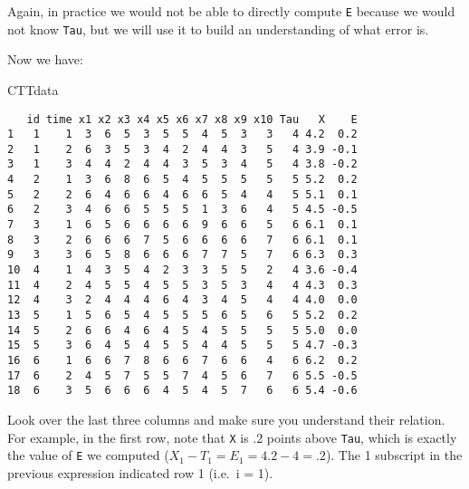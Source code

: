 \documentclass[
]{book}
\newenvironment{Shaded}{\begin{snugshade}}{\end{snugshade}}
\newcommand{\AttributeTok}[1]{\textcolor[rgb]{0.77,0.63,0.00}{#1}}
\newcommand{\DecValTok}[1]{\textcolor[rgb]{0.00,0.00,0.81}{#1}}
\newcommand{\FunctionTok}[1]{\textcolor[rgb]{0.00,0.00,0.00}{#1}}
\newcommand{\NormalTok}[1]{#1}
\newcommand{\OtherTok}[1]{\textcolor[rgb]{0.56,0.35,0.01}{#1}}
\newcommand{\SpecialCharTok}[1]{\textcolor[rgb]{0.00,0.00,0.00}{#1}}
\begin{document}
Again, in practice we would not be able to directly compute \texttt{E} because we would not know \texttt{Tau}, but we will use it to build an understanding of what error is.

Now we have:

\begin{Shaded}
\begin{Highlighting}[]
\NormalTok{CTTdata}
\end{Highlighting}
\end{Shaded}

\begin{verbatim}
   id time x1 x2 x3 x4 x5 x6 x7 x8 x9 x10 Tau   X    E
1   1    1  3  6  5  3  5  5  4  5  3   3   4 4.2  0.2
2   1    2  6  3  5  3  4  2  4  4  3   5   4 3.9 -0.1
3   1    3  4  4  2  4  4  3  5  3  4   5   4 3.8 -0.2
4   2    1  3  6  8  6  5  4  5  5  5   5   5 5.2  0.2
5   2    2  6  4  6  6  4  6  6  5  4   4   5 5.1  0.1
6   2    3  4  6  6  5  5  5  1  3  6   4   5 4.5 -0.5
7   3    1  6  5  6  6  6  6  9  6  6   5   6 6.1  0.1
8   3    2  6  6  6  7  5  6  6  6  6   7   6 6.1  0.1
9   3    3  6  5  8  6  6  6  7  7  5   7   6 6.3  0.3
10  4    1  4  3  5  4  2  3  3  5  5   2   4 3.6 -0.4
11  4    2  4  5  5  4  5  5  3  5  3   4   4 4.3  0.3
12  4    3  2  4  4  4  6  4  3  4  5   4   4 4.0  0.0
13  5    1  5  6  5  4  5  5  5  6  5   6   5 5.2  0.2
14  5    2  6  6  4  6  4  5  4  5  5   5   5 5.0  0.0
15  5    3  6  4  5  4  5  5  4  4  5   5   5 4.7 -0.3
16  6    1  6  6  7  8  6  6  7  6  6   4   6 6.2  0.2
17  6    2  4  5  7  5  5  7  4  5  6   7   6 5.5 -0.5
18  6    3  5  6  6  6  4  5  4  5  7   6   6 5.4 -0.6
\end{verbatim}

Look over the last three columns and make sure you understand their relation.
For example, in the first row, note that \texttt{X} is .2 points above \texttt{Tau}, which is exactly the value of \texttt{E} we computed (\(X_1 - T_1 = E_1 = 4.2 - 4 = .2\)).
The 1 subscript in the previous expression indicated row 1 (i.e.~i = 1).

\begin{Shaded}
\end{Shaded}
\end{document}
